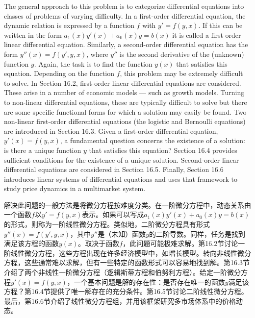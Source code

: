 \begin{original}
The general approach to this problem is to categorize differential equations into classes of problems of varying difficulty. In a first-order differential equation, the dynamic relation is expressed by a function $f$ with $y' = f(y, x)$. If this can be written in the form $a_1(x)y'(x) + a_0(x)y = b(x)$ it is called a first-order linear differential equation. Similarly, a second-order differential equation has the form $y''(x) = f(y', y, x)$, where $y''$ is the second derivative of the (unknown) function $y$. Again, the task is to find the function $y(x)$ that satisfies this equation. Depending on the function $f$, this problem may be extremely difficult to solve. In Section 16.2, first-order linear differential equations are considered. These arise in a number of economic models --- such as growth models. Turning to non-linear differential equations, these are typically difficult to solve but there are some specific functional forms for which a solution may easily be found. Two non-linear first-order differential equations (the logistic and Bernoulli equations) are introduced in Section 16.3. Given a first-order differential equation, $y'(x) = f(y, x)$, a fundamental question concerns the existence of a solution: is there a unique function $y$ that satisfies this equation? Section 16.4 provides sufficient conditions for the existence of a unique solution. Second-order linear differential equations are considered in Section 16.5. Finally, Section 16.6 introduces linear systems of differential equations and uses that framework to study price dynamics in a multimarket system.
\end{original}
\begin{translation}
解决此问题的一般方法是将微分方程按难度分类。在一阶微分方程中，动态关系由一个函数$f$以$y' = f(y, x)$表示。如果可以写成$a_1(x)y'(x) + a_0(x)y = b(x)$的形式，则称为一阶线性微分方程。类似地，二阶微分方程具有形式$y''(x) = f(y', y, x)$，其中$y''$是（未知）函数$y$的二阶导数。同样，任务是找到满足该方程的函数$y(x)$。取决于函数$f$，此问题可能极难求解。第16.2节讨论一阶线性微分方程，这些方程出现在许多经济模型中，如增长模型。转向非线性微分方程，这些通常难以求解，但有一些特定的函数形式可以容易地找到解。第16.3节介绍了两个非线性一阶微分方程（逻辑斯蒂方程和伯努利方程）。给定一阶微分方程$y'(x) = f(y, x)$，一个基本问题是解的存在性：是否存在唯一的函数$y$满足该方程？第16.4节提供了唯一解存在的充分条件。第16.5节讨论二阶线性微分方程。最后，第16.6节介绍了线性微分方程组，并用该框架研究多市场体系中的价格动态。
\end{translation}


